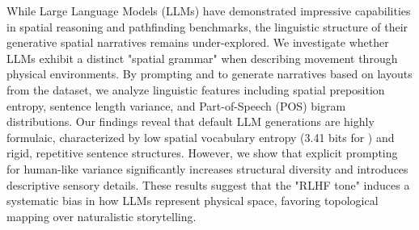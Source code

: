 While Large Language Models (LLMs) have demonstrated impressive capabilities in spatial reasoning and pathfinding benchmarks, the linguistic structure of their generative spatial narratives remains under-explored. We investigate whether LLMs exhibit a distinct "spatial grammar" when describing movement through physical environments. By prompting \gpto and \gptom to generate narratives based on layouts from the \babitask dataset, we analyze linguistic features including spatial preposition entropy, sentence length variance, and Part-of-Speech (POS) bigram distributions. Our findings reveal that default LLM generations are highly formulaic, characterized by low spatial vocabulary entropy (3.41 bits for \gpto) and rigid, repetitive sentence structures. However, we show that explicit prompting for human-like variance significantly increases structural diversity and introduces descriptive sensory details. These results suggest that the "RLHF tone" induces a systematic bias in how LLMs represent physical space, favoring topological mapping over naturalistic storytelling.
